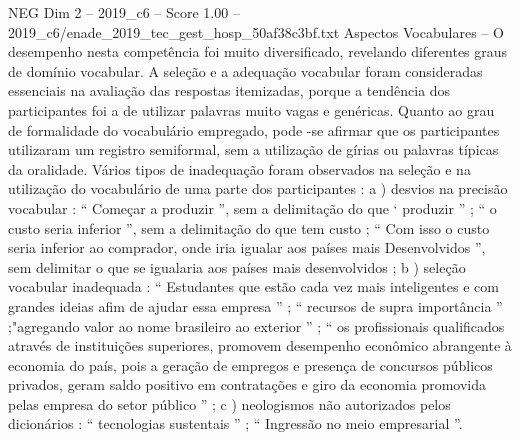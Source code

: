 \begin{textsample}{NEG Dim 2 – 2019\_c6 – Score 1.00 – 2019\_c6/enade\_2019\_tec\_gest\_hosp\_50af38c3bf.txt}
Aspectos Vocabulares – O desempenho nesta competência foi muito diversificado, revelando diferentes graus de domínio vocabular.
A seleção e a adequação vocabular foram consideradas essenciais na avaliação das respostas itemizadas, porque a tendência dos participantes foi a de utilizar palavras muito vagas e genéricas.
Quanto ao grau de formalidade do vocabulário empregado, pode -se afirmar que os participantes utilizaram um registro semiformal, sem a utilização de gírias ou palavras típicas da oralidade.
Vários tipos de inadequação foram observados na seleção e na utilização do vocabulário de uma parte dos participantes : a ) desvios na precisão vocabular : “ Começar a produzir ”, sem a delimitação do que ‘ produzir ” ; “ o custo seria inferior ”, sem a delimitação do que tem custo ; “ Com isso o custo seria inferior ao comprador, onde iria igualar aos países mais Desenvolvidos ”, sem delimitar o que se igualaria aos países mais desenvolvidos ; b ) seleção vocabular inadequada : “ Estudantes que estão cada vez mais inteligentes e com grandes ideias afim de ajudar essa empresa ” ; “ recursos de supra importância ” ;"agregando valor ao nome brasileiro ao exterior ” ; “ os profissionais qualificados através de instituições superiores, promovem desempenho econômico abrangente à economia do país, pois a geração de empregos e presença de concursos públicos privados, geram saldo positivo em contratações e giro da economia promovida pelas empresa do setor público ” ; c ) neologismos não autorizados pelos dicionários : “ tecnologias sustentais ” ; “ Ingressão no meio empresarial ”.

\end{textsample}
